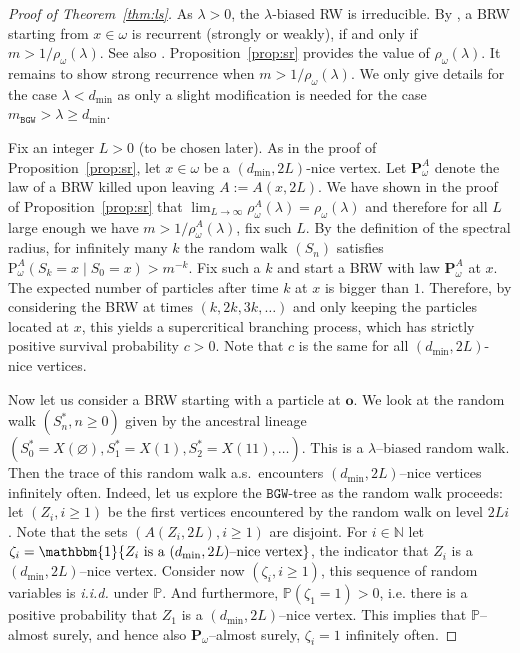 \documentclass[11 pt]{article}
\theoremstyle{definition}
\numberwithin{equation}{section}
\newcommand{\NN}{\mathbb{N}}
\newcommand{\PP}{\mathbb{P}} %
\newcommand{\rt}{\mathbf{o}} %
\newcommand{\Pw}{\mathbf{P}_{\omega}} %
\newcommand{\Pws}{\mathrm{P}_{\omega}} %
\begin{document}
\begin{proof}[Proof of Theorem~\ref{thm:ls}]
	As $\lambda>0$, the $\lambda$-biased RW is irreducible. By \cite[Theorem~2.12]{Mueller2008}, a BRW starting from $x\in \omega$ is recurrent (strongly or weakly), if and only if $m >1/\rho_{\omega}(\lambda)$.
	See also \cite[Theorem~3.2]{GantertMueller_critical_branching}.
	Proposition~\ref{prop:sr} provides the value of $\rho_\omega(\lambda)$. It remains to show strong recurrence 
	when $m >1/\rho_{\omega}(\lambda)$. We only give details for the case $\lambda<d_{\min}$ as only a slight modification is needed for the case $m_{\mathtt{BGW}} > \lambda \ge d_{\min}$.
	
	
	Fix an integer $L>0$ (to be chosen later). As in the proof of Proposition~\ref{prop:sr}, let $x\in \omega$ be a $(d_{\min},2 L)$-nice vertex. 
	Let $\mathbf{P}^{A}_{\omega}$ denote the law of a BRW killed upon leaving  $A:= A (x, 2 L)$. 
	We have shown in the proof of Proposition~\ref{prop:sr} that $\lim_{L \to \infty} \rho^A_{\omega}(\lambda) = \rho_{\omega}(\lambda)$ and therefore for all $L$ large enough we have $m > 1/\rho^A_{\omega}(\lambda)$, fix such $L$. 
	By the definition of the spectral radius, for infinitely many $k$ the random walk $(S_n)$ satisfies $\Pws^A(S_k= x \mid S_0 = x) > m^{-k}$. Fix such a $k$ and
	start a BRW with law $\mathbf{P}^{A}_{\omega}$ at $x$. The expected number of particles after time $k$ at $x$ is bigger than $1$. Therefore, by considering the BRW at times $(k, 2k, 3k,\ldots)$ and only keeping the particles located at $x$, this yields a supercritical branching process, which has strictly positive survival probability $c>0$. Note that $c$ is the same for all $(d_{\min},2 L)$-nice vertices. 
	
	 Now let us consider a BRW starting with a particle at $\rt$. We look at the random walk $(S^*_n, n\ge 0)$ given by the ancestral lineage $(S^*_0 = X (\varnothing), S^*_1 = X(1), S^*_2 = X(11), \ldots)$. This is a $\lambda$--biased random walk.
	 Then the trace of this random walk a.s.\ encounters $(d_{\min},2L)$--nice vertices infinitely often. 
	 Indeed, let us explore the $\mathtt{BGW}$-tree as the random walk proceeds: let $(Z_i,i\geq 1)$ be the first vertices encountered by the random walk on level $ 2Li$. Note that the sets $(A(Z_i,2L),i\geq 1)$ are disjoint. For $i\in \NN$ let $\zeta_i =  \mathbbm{1}\{Z_i \text{ is a $(d_{\min},2L)$--nice vertex}\}$, the indicator that $Z_i$ is a $(d_{\min},2L)$--nice vertex. Consider now $(\zeta_i,i\geq 1)$, this sequence of random variables is \emph{i.i.d.} under $\PP$. And furthermore, $\PP(\zeta_1 = 1)>0$, i.e. there is a positive probability that $Z_1$ is a $(d_{\min},2L)$--nice vertex. This implies that $\PP$--almost surely, and hence also $\Pw$--almost surely, $\zeta_i=1$ infinitely often. 
	 

\end{proof}
\end{document}

